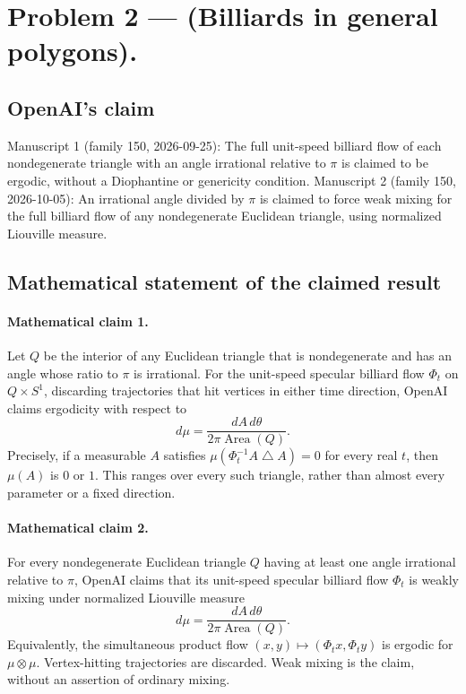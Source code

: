 \documentclass[11pt]{article}
\begin{document}
\section*{Problem 2 — (Billiards in general polygons).}

\subsection{OpenAI's claim}
Manuscript 1 (family 150, 2026-09-25): The full unit-speed billiard flow of each nondegenerate triangle with an angle irrational relative to $\pi$ is claimed to be ergodic, without a Diophantine or genericity condition. Manuscript 2 (family 150, 2026-10-05): An irrational angle divided by $\pi$ is claimed to force weak mixing for the full billiard flow of any nondegenerate Euclidean triangle, using normalized Liouville measure.

\subsection{Mathematical statement of the claimed result}
\paragraph{Mathematical claim 1.} Let $Q$ be the interior of any Euclidean triangle that is nondegenerate and has an angle whose ratio to $\pi$ is irrational. For the unit-speed specular billiard flow $\Phi_t$ on $Q\times S^1$, discarding trajectories that hit vertices in either time direction, OpenAI claims ergodicity with respect to
\[
d\mu=\frac{dA\,d\theta}{2\pi\operatorname{Area}(Q)}.
\]
Precisely, if a measurable $A$ satisfies $\mu(\Phi_t^{-1}A\mathbin{\triangle} A)=0$ for every real $t$, then $\mu(A)$ is $0$ or $1$. This ranges over every such triangle, rather than almost every parameter or a fixed direction.

\paragraph{Mathematical claim 2.} For every nondegenerate Euclidean triangle $Q$ having at least one angle irrational relative to $\pi$, OpenAI claims that its unit-speed specular billiard flow $\Phi_t$ is weakly mixing under normalized Liouville measure
\[
d\mu=\frac{dA\,d\theta}{2\pi\operatorname{Area}(Q)}.
\]
Equivalently, the simultaneous product flow $(x,y)\mapsto(\Phi_tx,\Phi_ty)$ is ergodic for $\mu\otimes\mu$. Vertex-hitting trajectories are discarded. Weak mixing is the claim, without an assertion of ordinary mixing.
\end{document}
